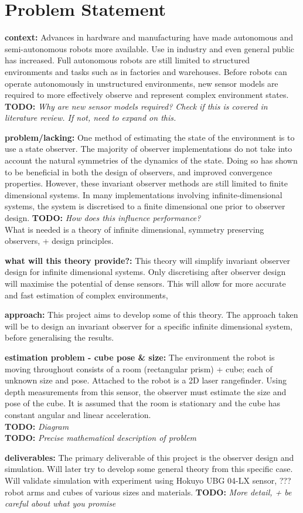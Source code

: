 \section{Problem Statement}

\textbf{context:}
Advances in hardware and manufacturing have made autonomous and semi-autonomous robots more available. Use in industry and even general public has increased. Full autonomous robots are still limited to structured environments and tasks such as in factories and warehouses.
Before robots can operate autonomously in unstructured environments, new sensor models are required to more effectively observe and represent complex environment states. \textbf{TODO:} \textit{Why are new sensor models required? Check if this is covered in literature review. If not, need to expand on this.}

\textbf{problem/lacking:}
One method of estimating the state of the environment is to use a state observer. The majority of observer implementations do not take into account the natural symmetries of the dynamics of the state. Doing so has shown to be beneficial in both the design of observers, and improved convergence properties.
However, these invariant observer methods are still limited to finite dimensional systems. In many implementations involving infinite-dimensional systems, the system is discretised to a finite dimensional one prior to observer design.  \textbf{TODO:} \textit{How does this influence performance?}\\
What is needed is a theory of infinite dimensional, symmetry preserving observers, + design principles.

\textbf{what will this theory provide?:}
This theory will simplify invariant observer design for infinite dimensional systems. Only discretising after observer design will maximise the potential of dense sensors. This will allow for more accurate and fast estimation of complex environments,

\textbf{approach:}
This project aims to develop some of this theory. The approach taken will be to design an invariant observer for a specific infinite dimensional system, before generalising the results.

\textbf{estimation problem - cube pose \& size:}
The environment the robot is moving throughout consists of a room (rectangular prism) + cube; each of unknown size and pose.
Attached to the robot is a 2D laser rangefinder. Using depth measurements from this sensor, the observer must estimate the size and pose of the cube. It is assumed that the room is stationary and the cube has constant angular and linear acceleration.\\
\textbf{TODO:} \textit{Diagram}\\
\textbf{TODO:} \textit{Precise mathematical description of problem}

\textbf{deliverables:} 
The primary deliverable of this project is the observer design and simulation. Will later try to develop some general theory from this specific case. Will validate simulation with experiment using Hokuyo UBG 04-LX sensor, ??? robot arms and cubes of various sizes and materials.
\textbf{TODO:} \textit{More detail, + be careful about what you promise}\\

